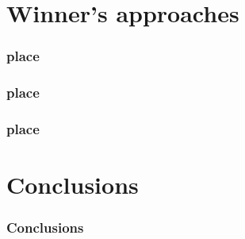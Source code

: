 \documentclass{beamer}
\begin{document}
\section{Winner's approaches} 
\begin{frame}\frametitle{ place}
\end{frame}
\begin{frame}\frametitle{ place}
\end{frame}
\begin{frame}\frametitle{ place}
\end{frame}









\section{Conclusions}
\begin{frame}\frametitle{Conclusions}
\end{frame}













%
%
%
\end{document}
